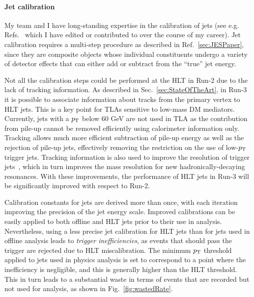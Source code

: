 

\paragraph{Jet calibration} My team and I have long-standing expertise in the calibration of jets (see e.g. Refs.~\cite{JESPapersIAmAuthorOf} which I have edited or contributed to over the course of my career). 
Jet calibration requires a multi-step procedure as described in Ref.~\ref{sec:JESPaper}, since they are composite objects whose individual constituents undergo a variety of detector effects that can either add or subtract from the “true” jet energy. 

Not all the calibration steps could be performed at the HLT in Run-2 due to the lack of tracking information. As described in Sec.~\ref{sec:StateOfTheArt}, in Run-3 it is possible to associate information about tracks from the primary vertex to HLT jets.  This is a key point for TLAs sensitive to low-mass DM mediators. Currently, jets with a $p_{\rm{T}}$ below 60 GeV are not used in TLA as the contribution from pile-up cannot be removed efficiently using calorimeter information only. Tracking allows much more efficient subtraction of pile-up energy as well as the rejection of pile-up jets, effectively removing the restriction on the use of low-$p_{\rm{T}}$ trigger jets. Tracking information is also used to improve the resolution of trigger jets~\cite{GSC}, which in turn improves the mass resolution for new hadronically-decaying resonances. 
With these improvements, the performance of HLT jets in Run-3 will be significantly improved with respect to Run-2. 

 
Calibration constants for jets are derived more than once, with each iteration improving the precision of the jet energy scale. Improved calibrations can be easily applied to both offline and HLT jets prior to their use in analysis. 
Nevertheless, using a less precise jet calibration for HLT jets than for jets used in offline analysis leads to \textit{trigger inefficiencies}, as events that should pass the trigger are rejected due to HLT miscalibration. 
The minimum $p_{\rm{T}}$ threshold applied to jets used in physics analysis is set to correspond to a point where the inefficiency is negligible, and this is generally higher than the HLT threshold. 
This in turn leads to a substantial waste in terms of events that are recorded but not used for analysis, as shown in Fig.~\ref{fig:wastedRate}. 

